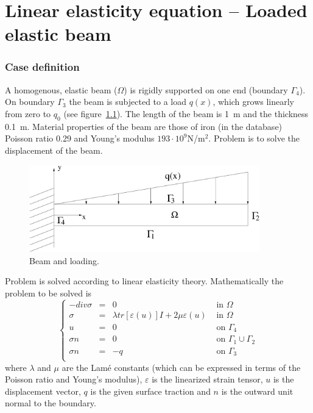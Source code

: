 \chapter{Linear elasticity equation -- Loaded elastic beam}


\subsection*{Case definition}

A homogenous, elastic beam ($\Omega$) is rigidly supported on one 
end (boundary $\Gamma_4$). On boundary $\Gamma_3$ the beam is subjected 
to a load $q(x)$, which grows linearly from zero to $q_0$ 
(see figure~\ref{fg:beam}). The length of the beam is 1~m and the thickness 0.1~m.
Material properties of the beam are those of iron (in the database) Poisson 
ratio 0.29 and Young's modulus $193\cdot 10^9$N/m$^2$. Problem is to solve the 
displacement of the beam.  

\begin{figure}[h]
\centering
\includegraphics[width=100mm]{Beam}
\caption{Beam and loading.}\label{fg:beam}
\end{figure}

Problem is solved according to linear elasticity theory. Mathematically 
the problem to be solved is
\begin{equation}
\left \{
\begin{array}{rcll}
-div \sigma & = & 0 & \mbox{ in } \Omega \\
\sigma & = & \lambda tr [\varepsilon(u)]I + 2 \mu \varepsilon(u) &
\mbox{ in } \Omega \\
u & = & 0 & \mbox{ on } \Gamma_4 \\
\sigma n & = & 0 & \mbox{ on } \Gamma_1 \cup \Gamma_2 \\
\sigma n & = & -q & \mbox{ on } \Gamma_3 \\
\end{array}
\right .
\end{equation}
where $\lambda$ and $\mu$ are the Lam\'{e} constants (which can be expressed 
in terms of the Poisson ratio and Young's modulus), $\varepsilon$ is the 
linearized strain tensor, $u$ is the displacement vector, $q$ is the given
surface traction and $n$ is the outward unit normal to the boundary.



